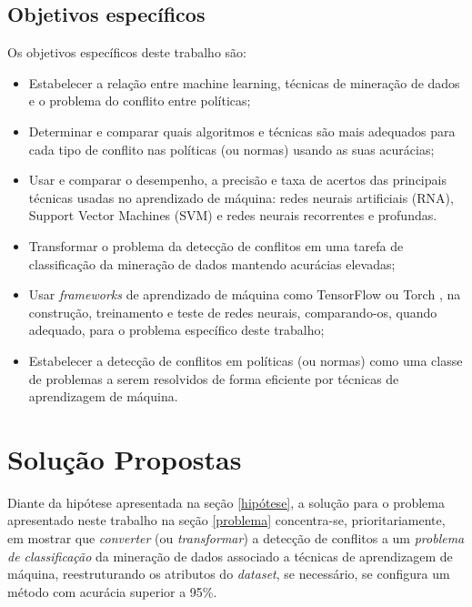 \documentclass[
	12pt,				%
	openright,			%
	twoside,			%
	a4paper,			%
	english,			%
	french,				%
	spanish,			%
	brazil				%
	]{abntex2}
\begin{document}
\subsection{Objetivos específicos}
Os objetivos específicos deste trabalho são:
\begin{itemize}	
		\item Estabelecer a relação entre machine learning, técnicas de mineração de dados e o problema do conflito entre políticas;
		\item Determinar e comparar quais algoritmos e técnicas são mais adequados para cada tipo de conflito nas políticas (ou normas) usando as suas acurácias;
		\item Usar e comparar o desempenho, a precisão e taxa de acertos das principais técnicas usadas no aprendizado de máquina: redes neurais artificiais (RNA), Support Vector Machines (SVM) e redes neurais recorrentes e profundas.
		\item Transformar o problema da detecção de conflitos em uma tarefa de classificação da mineração de dados mantendo acurácias elevadas;
		\item Usar \textit{frameworks} de aprendizado de máquina como TensorFlow \cite{kadimisetty_tensorflow_2018} ou Torch \cite{NEURIPS2019_9015}, na construção, treinamento e teste de redes neurais, comparando-os, quando adequado, para o problema específico deste trabalho;
		\item Estabelecer a detecção de conflitos em políticas (ou normas) como uma  classe de problemas a serem resolvidos de forma eficiente por técnicas de aprendizagem de máquina.
\end{itemize}


\section{Solução Propostas}\label{solucao_proposta}
Diante da hipótese apresentada na seção \ref{hipótese}, a solução para o problema apresentado neste trabalho na seção \ref{problema} concentra-se, prioritariamente, em mostrar que \textit{converter} (ou \textit{transformar}) a detecção de conflitos a um \textit{problema de classificação} da mineração de dados associado a técnicas de aprendizagem de máquina, reestruturando os atributos do \textit{dataset}, se necessário, se configura um método com acurácia superior a 95\%.
\end{document}
